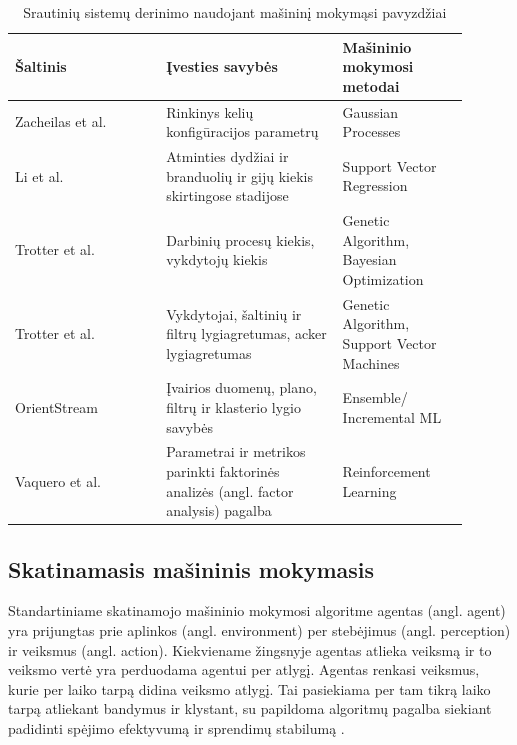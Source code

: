 \documentclass{VUMIFPSbakalaurinis}
\begin{document}
\begin{longtable}{|p{0.3\linewidth}|p{0.35\linewidth}|p{0.25\linewidth}|}
    \caption{Srautinių sistemų derinimo naudojant mašininį mokymąsi pavyzdžiai \cite{herodotou2020survey}}
    \label{ml–in–stream} \\
    \hline
    \rowcolor[HTML]{C0C0C0} 
    Šaltinis                                        & Įvesties savybės                                                                    & Mašininio mokymosi metodai                 \\ \hline
    Zacheilas et al. \cite{zacheilas2015elastic}    & Rinkinys kelių konfigūracijos parametrų                                             & Gaussian Processes                         \\ \hline
    Li et al. \cite{li2016performance}              & Atminties dydžiai ir branduolių ir gijų kiekis skirtingose stadijose                & Support Vector Regression                  \\ \hline
    Trotter et al. \cite{Trotter2017Into}           & Darbinių procesų kiekis, vykdytojų kiekis                                           & Genetic Algorithm, Bayesian Optimization   \\ \hline
    Trotter et al. \cite{trotter2019forecasting}    & Vykdytojai, šaltinių ir filtrų lygiagretumas, acker lygiagretumas                   & Genetic Algorithm, Support Vector Machines \\ \hline
    OrientStream \cite{wang2017automating}          & Įvairios duomenų, plano, filtrų ir klasterio lygio savybės                          & Ensemble/ Incremental ML                    \\ \hline
    Vaquero et al. \cite{vaquero2018autotuning}     & Parametrai ir metrikos parinkti faktorinės analizės (angl. factor analysis) pagalba & Reinforcement Learning                     \\ \hline
\end{longtable}

\subsection{Skatinamasis mašininis mokymasis}
Standartiniame skatinamojo mašininio mokymosi algoritme agentas (angl. agent) yra prijungtas prie aplinkos (angl. environment) per stebėjimus (angl. perception) ir veiksmus (angl. action). Kiekviename žingsnyje agentas atlieka veiksmą ir to veiksmo vertė yra perduodama agentui per atlygį. Agentas renkasi veiksmus, kurie per laiko tarpą didina veiksmo atlygį. Tai pasiekiama per tam tikrą laiko tarpą atliekant bandymus ir klystant, su papildoma algoritmų pagalba siekiant padidinti spėjimo efektyvumą ir sprendimų stabilumą \cite{reinf}.     
\end{document}
